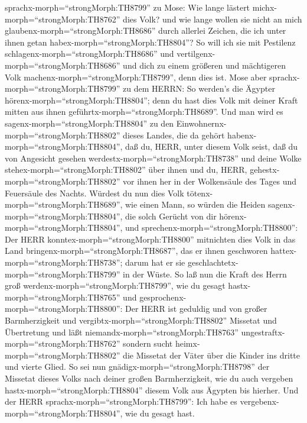 sprachx-morph=``strongMorph:TH8799'' zu Mose: Wie lange lästert
michx-morph=``strongMorph:TH8762'' dies Volk? und wie lange wollen sie
nicht an mich glaubenx-morph=``strongMorph:TH8686'' durch allerlei
Zeichen, die ich unter ihnen getan habex-morph=``strongMorph:TH8804''?
 So will ich sie mit Pestilenz
schlagenx-morph=``strongMorph:TH8686'' und
vertilgenx-morph=``strongMorph:TH8686'' und dich zu einem größeren und
mächtigeren Volk machenx-morph=``strongMorph:TH8799'', denn dies ist.
 Mose aber sprachx-morph=``strongMorph:TH8799'' zu dem
HERRN: So werden's die Ägypter hörenx-morph=``strongMorph:TH8804''; denn
du hast dies Volk mit deiner Kraft mitten aus ihnen
geführtx-morph=``strongMorph:TH8689''.  Und man wird es
sagenx-morph=``strongMorph:TH8804'' zu den
Einwohnernx-morph=``strongMorph:TH8802'' dieses Landes, die da gehört
habenx-morph=``strongMorph:TH8804'', daß du, HERR, unter diesem Volk
seist, daß du von Angesicht gesehen
werdestx-morph=``strongMorph:TH8738'' und deine Wolke
stehex-morph=``strongMorph:TH8802'' über ihnen und du, HERR,
gehestx-morph=``strongMorph:TH8802'' vor ihnen her in der Wolkensäule
des Tages und Feuersäule des Nachts.  Würdest du nun dies
Volk tötenx-morph=``strongMorph:TH8689'', wie einen Mann, so würden die
Heiden sagenx-morph=``strongMorph:TH8804'', die solch Gerücht von dir
hörenx-morph=``strongMorph:TH8804'', und
sprechenx-morph=``strongMorph:TH8800'':  Der HERR
konntex-morph=``strongMorph:TH8800'' mitnichten dies Volk in das Land
bringenx-morph=``strongMorph:TH8687'', das er ihnen geschworen
hattex-morph=``strongMorph:TH8738''; darum hat er sie
geschlachtetx-morph=``strongMorph:TH8799'' in der Wüste. 
So laß nun die Kraft des Herrn groß
werdenx-morph=``strongMorph:TH8799'', wie du gesagt
hastx-morph=``strongMorph:TH8765'' und
gesprochenx-morph=``strongMorph:TH8800'':  Der HERR ist
geduldig und von großer Barmherzigkeit und
vergibtx-morph=``strongMorph:TH8802'' Missetat und Übertretung und läßt
niemandx-morph=``strongMorph:TH8763''
ungestraftx-morph=``strongMorph:TH8762'' sondern sucht
heimx-morph=``strongMorph:TH8802'' die Missetat der Väter über die
Kinder ins dritte und vierte Glied.  So sei nun
gnädigx-morph=``strongMorph:TH8798'' der Missetat dieses Volks nach
deiner großen Barmherzigkeit, wie du auch vergeben
hastx-morph=``strongMorph:TH8804'' diesem Volk aus Ägypten bis hierher.
 Und der HERR sprachx-morph=``strongMorph:TH8799'': Ich
habe es vergebenx-morph=``strongMorph:TH8804'', wie du gesagt hast.
